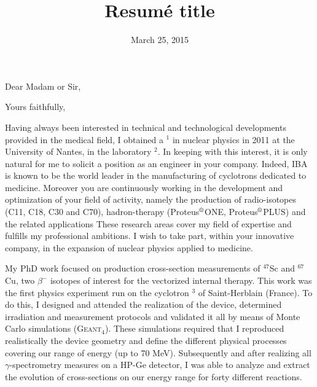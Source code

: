 \documentclass[11pt,a4paper,sans]{moderncv}        %
\title{Resumé title}                               %
\begin{document}
\date{March 25, 2015}
\opening{Dear Madam or Sir,}
\closing{Yours faithfully,}
\makelettertitle
\justifying
Having always been interested in technical and technological developments provided in the medical field, I obtained a \href{https://tel.archives-ouvertes.fr/tel-00662649}{\underline{\color{blue}{PhD}}}$^1$ in nuclear physics in 2011 at the University of Nantes, in the laboratory \href{http://www-subatech.in2p3.fr/fr/recherche/nucleaire-et-sante/prisma/presentation}{\underline{\color{blue}{Subatech}}}$^2$.
In keeping with this interest, it is only natural for me to solicit a position as an engineer in your company.
Indeed, IBA is known to be the world leader in the manufacturing of cyclotrons dedicated to medicine.
Moreover you are continuously working in the development and optimization of your field of activity, namely the production of radio-isotopes (C11, C18, C30 and C70), hadron-therapy (Proteus$^{\mbox{\scriptsize{\textregistered}}}$ONE, Proteus$^{\mbox{\scriptsize{\textregistered}}}$PLUS) and the related applications
These research areas cover my field of expertise and fulfills my professional ambitions.
I wish to take part, within your innovative company, in the expansion of nuclear physics applied to medicine.

My PhD work focused on production cross-section measurements of $^{47}$Sc and $^{67}$Cu, two $\beta^-$ isotopes of interest for the vectorized internal therapy.
This work was the first physics experiment run on the cyclotron \href{http://www.cyclotron-nantes.fr/spip.php?rubrique85}{\underline{}}$^3$ of Saint-Herblain (France).
To do this, I designed and attended the realization of the device, determined irradiation and measurement protocols and validated it all by means of Monte Carlo simulations (G\textsc{eant}$_4$).
These simulations required that I reproduced realistically the device geometry and define the different physical processes covering our range of energy (up to 70 MeV).
Subsequently and after realizing all $\gamma$-spectrometry measures on a HP-Ge detector, I was able to analyze and extract the evolution of cross-sections on our energy range for forty different reactions.
\end{document}
